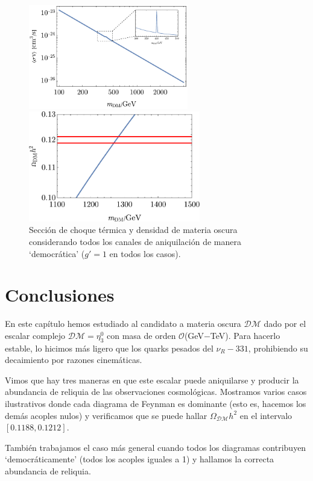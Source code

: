 \begin{figure}[h]
\centering
\begin{minipage}{.5\textwidth}
  \centering
  \includegraphics[height=1.8in]{Results/svCOMBINED.pdf}
\end{minipage}%
\centering
\begin{minipage}{.6\textwidth}
  \centering
  \includegraphics[height=1.9in]{Results/COMBINED.pdf}
\end{minipage}%
\caption[\hspace{0.175in}Sección de choque térmica y densidad de materia oscura]{Sección de choque térmica y densidad de materia oscura considerando todos los canales de aniquilación de manera `democrática' ($g'=1$ en todos los casos).} 
\label{Results-COMBINED}
\end{figure}

\newpage

\section[\hspace{-0.14in}Conclusiones]{Conclusiones}
En este capítulo hemos estudiado al candidato a materia oscura $\mathcal{DM}$ dado por el escalar complejo $\mathcal{DM} = \eta_3^0$ con masa de orden $\mathcal{O}$(GeV$-$TeV). Para hacerlo estable, lo hicimos más ligero que los quarks pesados del $\nu_R-331$, prohibiendo su decaimiento por razones cinemáticas. 

Vimos que hay tres maneras en que este escalar puede aniquilarse y producir la abundancia de reliquia de las observaciones cosmológicas. Mostramos varios casos ilustrativos donde cada diagrama de Feynman es dominante (esto es, hacemos los demás acoples nulos) y verificamos que se puede hallar $\Omega_\mathcal{DM}h^2$ en el intervalo $[0.1188,0.1212]$.

También trabajamos el caso más general cuando todos los diagramas contribuyen `democráticamente' (todos los acoples iguales a 1) y hallamos la correcta abundancia de reliquia.
